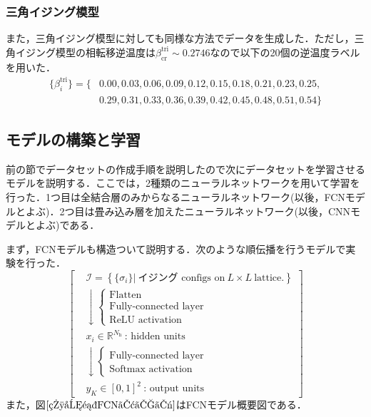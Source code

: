 \documentclass[a4paper,11pt]{jsreport}
\begin{document}
\subsubsection*{三角イジング模型}
また，三角イジング模型に対しても同様な方法でデータを生成した．ただし，三角イジング模型の相転移逆温度は$\beta_{\text{cr}}^{\text{tri}} \sim 0.2746$なので以下の20個の逆温度ラベルを用いた．
\begin{align*}
  \{\beta_i^{\text{tri}}\} 
  = \{ &0.00,0.03,0.06,0.09,0.12,0.15,0.18,0.21,0.23,0.25,\\
  &0.29,0.31,0.33,0.36,0.39,0.42,0.45,0.48,0.51,0.54 \}
\end{align*}

\subsection{モデルの構築と学習}
前の節でデータセットの作成手順を説明したので次にデータセットを学習させるモデルを説明する．ここでは，2種類のニューラルネットワークを用いて学習を行った．1つ目は全結合層のみからなるニューラルネットワーク(以後，FCNモデルとよぶ)．2つ目は畳み込み層を加えたニューラルネットワーク(以後，CNNモデルとよぶ)である．\par
まず，FCNモデルも構造ついて説明する．次のような順伝播を行うモデルで実験を行った．
\begin{equation}
  \left[
    \begin{aligned}
      & \mathcal{I} = \left\{ \{ \sigma_i \} \Big| \ \text{イジング configs on} \ L \times L \ \text{lattice.} \right\} \\
       & \downarrow
      \begin{cases}
        \text{Flatten} \\
        \text{Fully-connected layer} \\
        \text{ReLU activation}
      \end{cases} \\
       & x_i \in \mathbb{R}^{N_{\text{h}}} \ \text{: hidden units} \\
       & \downarrow
      \begin{cases}
        \text{Fully-connected layer} \\
        \text{Softmax activation}
      \end{cases} \\
       & y_K \in [0,1]^{2} \ \text{: output units}
    \end{aligned}
    \right]
\end{equation}
また，図$\ref{相分類FCNモデル}$はFCNモデル概要図である．
\end{document}
